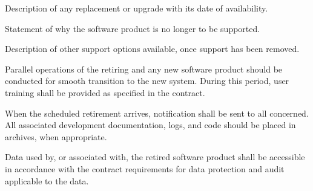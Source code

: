 \begin{adjustwidth}{2em}{0pt}
\begin{compactenum}
\begin{compactenum}
\begin{compactenum}
							\item Description of any replacement or upgrade with its date of availability.

							\item Statement of why the software product is no longer to be supported.

							\item Description of other support options available, once support has been removed.

						\end{compactenum}

						\item Parallel operations of the retiring and any new software product should be conducted for smooth transition to the new system. During this period, user training shall be provided as specified in the contract.

						\item When the scheduled retirement arrives, notification shall be sent to all concerned. All associated development documentation, logs, and code should be placed in archives, when appropriate.

						\item Data used by, or associated with, the retired software product shall be accessible in accordance with the contract requirements for data protection and audit applicable to the data.

					\end{compactenum}

				\end{compactenum}

			\end{adjustwidth}